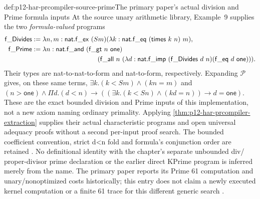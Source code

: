 \begin{hbexample}{def:p12-har-prcompiler-source-prime}{The primary paper's actual division and Prime formula inputs}
At the source unary arithmetic library, Example~9 supplies the two
\emph{formula-valued} programs
\[
\begin{aligned}
 \mathsf{f\_Divides}&:=\lambda n,m:\mathsf{nat}.
  \mathsf{f\_ex}\ (S m)
       (\lambda k:\mathsf{nat}.\mathsf{f\_eq}\ (\mathsf{times}\ k\ n)\ m),\\
 \mathsf{f\_Prime}&:=\lambda n:\mathsf{nat}.
  \mathsf{f\_and}\ (\mathsf{f\_gt}\ n\ \mathsf{one})\\
 &\hspace{35mm}(\mathsf{f\_all}\ n\ (\lambda d:\mathsf{nat}.
    \mathsf{f\_imp}\ (\mathsf{f\_Divides}\ d\ n)
                         (\mathsf{f\_eq}\ d\ \mathsf{one}))).
\end{aligned}
\]
Their types are nat-to-nat-to-form and nat-to-form, respectively.
Expanding \(\mathcal P\) gives, on these same terms,
\(\exists k.(k<S m)\wedge(kn=m)\) and
\((n>\mathsf{one})\wedge\Pi d.(d<n)\to
 ((\exists k.(k<S n)\wedge(kd=n))\to d=\mathsf{one})\).
These are the exact bounded division and Prime inputs of this
implementation, not a new axiom naming ordinary primality. Applying
\cref{thm:p12-har-prcompiler-extraction} supplies their actual
characteristic programs and open universal adequacy proofs without
a second per-input proof search. The bounded coefficient convention,
strict d<n fold and formula's conjunction order are retained
\cite[Examples~6,9, pp.~17,19]{OostdijkGeuvers2000ProofByComputationPreprint}.
No definitional identity with the chapter's separate unbounded div/
proper-divisor prime declaration or the earlier direct KPrime program
is inferred merely from the name. The primary paper reports its
Prime 61 computation and unary/nonoptimized costs historically; this
entry does not claim a newly executed kernel computation or a finite
61 trace for this different generic search
\cite[pp.~24--25]{OostdijkGeuvers2000ProofByComputationPreprint}.
\end{hbexample}


